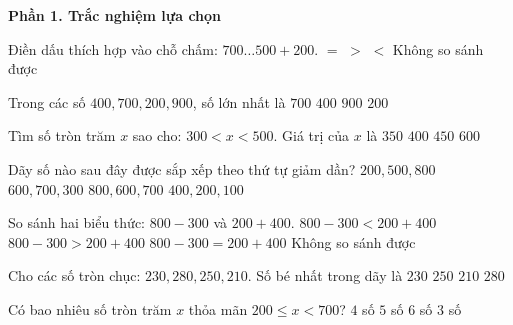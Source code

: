 \textbf{Phần 1. Trắc nghiệm lựa chọn}

\begin{ex} %
Điền dấu thích hợp vào chỗ chấm: $700 \dots 500 + 200$.
\choice
{\True $=$}
{$>$}
{$<$}
{Không so sánh được}
\end{ex}

\begin{ex} %
Trong các số $400, 700, 200, 900$, số lớn nhất là
\choice
{$700$}
{$400$}
{\True $900$}
{$200$}
\end{ex}

\begin{ex} %
Tìm số tròn trăm $x$ sao cho: $300 < x < 500$. Giá trị của $x$ là
\choice
{$350$}
{\True $400$}
{$450$}
{$600$}
\end{ex}

\begin{ex} %
Dãy số nào sau đây được sắp xếp theo thứ tự giảm dần?
\choice
{$200, 500, 800$}
{$600, 700, 300$}
{$800, 600, 700$}
{\True $400, 200, 100$}
\end{ex}

\begin{ex} %
So sánh hai biểu thức: $800 - 300$ và $200 + 400$.
\choice
{\True $800 - 300 < 200 + 400$}
{$800 - 300 > 200 + 400$}
{$800 - 300 = 200 + 400$}
{Không so sánh được}
\end{ex}

\begin{ex} %
Cho các số tròn chục: $230, 280, 250, 210$. Số bé nhất trong dãy là
\choice
{$230$}
{$250$}
{\True $210$}
{$280$}
\end{ex}

\begin{ex} %
Có bao nhiêu số tròn trăm $x$ thỏa mãn $200 \le x < 700$?
\choice
{$4$ số}
{\True $5$ số}
{$6$ số}
{$3$ số}
\end{ex}

